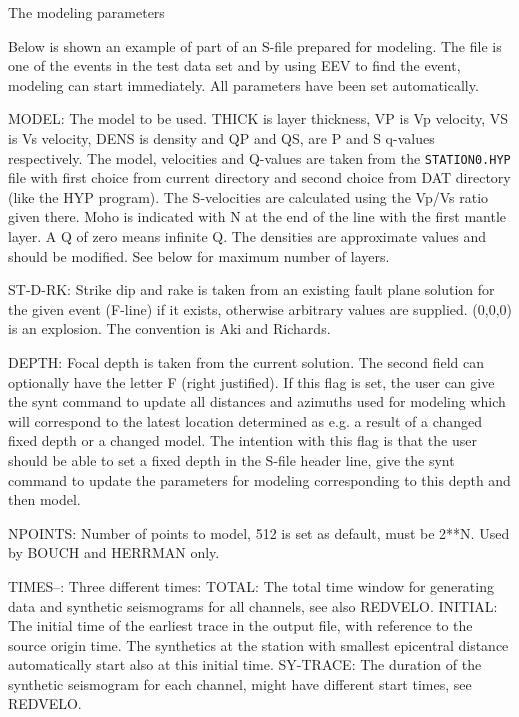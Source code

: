 The modeling parameters 

Below is shown an example of part of an S-file prepared for modeling. The file is one of the events in the test data set and by using EEV to find the event, modeling can start immediately. All parameters have been set automatically. 



MODEL: The model to be used. THICK is layer thickness, VP is Vp velocity, VS is Vs velocity, DENS is density and QP and QS, are P and S q-values respectively. The model, velocities and Q-values are taken from the \texttt{STATION0.HYP} file with first choice from current directory and second choice from DAT directory (like the HYP program). The S-velocities are calculated using the Vp/Vs ratio given there. Moho is indicated with N at the end of the line with the first mantle layer. A Q of zero means 
infinite Q. The densities are approximate values and should be modified. See below for maximum 
number of layers. 

ST-D-RK: Strike dip and rake is taken from an existing fault plane solution for the given event (F-line) if it exists, otherwise arbitrary values are supplied. 
(0,0,0) is an explosion.
The convention is Aki and Richards. 

DEPTH: Focal depth is taken from the current solution. The second field can optionally have the letter F (right justified). If this flag is set, the user can give the synt command to update all distances and azimuths used for modeling which will correspond to the latest location determined as e.g. a result of a changed fixed depth or a changed model. The intention with this flag is that the user should be able to set a fixed depth in the S-file header line, give the synt command to update the parameters for modeling corresponding to this depth and then model. 

NPOINTS: Number of points to model, 512 is set as default, must be 2**N. Used by BOUCH and 
HERRMAN only.

TIMES--: Three different times:\newline
TOTAL: The total time window for generating data and synthetic seismograms for all channels, see also REDVELO. \newline
INITIAL:   The initial time of the earliest trace in the output file, with reference to the source origin time. The synthetics at the station with smallest epicentral distance automatically start also at this initial time. \newline
SY-TRACE: The duration of the synthetic seismogram for each channel, might have different start times,  see REDVELO. 

